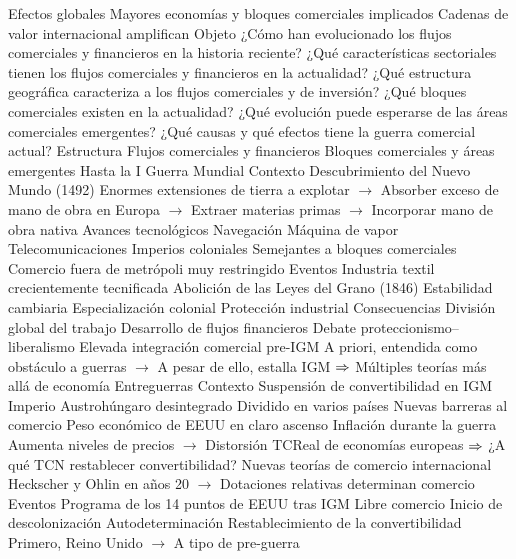 \documentclass{nuevotema}
\begin{document}
\begin{esquemal}
				\4 Efectos globales
				\4[] Mayores economías y bloques comerciales implicados
				\4[] Cadenas de valor internacional amplifican
		\2 Objeto
			\3 ¿Cómo han evolucionado los flujos comerciales y financieros en la historia reciente?
			\3 ¿Qué características sectoriales tienen los flujos comerciales y financieros en la actualidad?
			\3 ¿Qué estructura geográfica caracteriza a los flujos comerciales y de inversión?
			\3 ¿Qué bloques comerciales existen en la actualidad?
			\3 ¿Qué evolución puede esperarse de las áreas comerciales emergentes?
			\3 ¿Qué causas y qué efectos tiene la guerra comercial actual?
		\2 Estructura
			\3 Flujos comerciales y financieros
			\3 Bloques comerciales y áreas emergentes
	\1 
		\2 Hasta la I Guerra Mundial
			\3 Contexto
				\4 Descubrimiento del Nuevo Mundo (1492)
				\4[] Enormes extensiones de tierra a explotar
				\4[] $\to$ Absorber exceso de mano de obra en Europa
				\4[] $\to$ Extraer materias primas
				\4[] $\to$ Incorporar mano de obra nativa
				\4 Avances tecnológicos
				\4[] Navegación
				\4[] Máquina de vapor
				\4[] Telecomunicaciones
				\4 Imperios coloniales
				\4[] Semejantes a bloques comerciales
				\4[] Comercio fuera de metrópoli muy restringido
			\3 Eventos
				\4 Industria textil crecientemente tecnificada
				\4 Abolición de las Leyes del Grano (1846)
				\4 Estabilidad cambiaria
				\4 Especialización colonial
				\4 Protección industrial
			\3 Consecuencias
				\4 División global del trabajo
				\4 Desarrollo de flujos financieros
				\4 Debate proteccionismo--liberalismo
				\4 Elevada integración comercial pre-IGM
				\4[] A priori, entendida como obstáculo a guerras
				\4[] $\to$ A pesar de ello, estalla IGM
				\4[] $\Rightarrow$ Múltiples teorías más allá de economía
		\2 Entreguerras
			\3 Contexto
				\4 Suspensión de convertibilidad en IGM
				\4 Imperio Austrohúngaro desintegrado
				\4[] Dividido en varios países
				\4[] Nuevas barreras al comercio
				\4 Peso económico de EEUU en claro ascenso
				\4 Inflación durante la guerra
				\4[] Aumenta niveles de precios
				\4[] $\to$ Distorsión TCReal de economías europeas
				\4[] $\Rightarrow$ ¿A qué TCN restablecer convertibilidad?
				\4 Nuevas teorías de comercio internacional
				\4[] Heckscher y Ohlin en años 20
				\4[] $\to$ Dotaciones relativas determinan comercio
			\3 Eventos
				\4 Programa de los 14 puntos de EEUU tras IGM
				\4[] Libre comercio
				\4[] Inicio de descolonización
				\4[] Autodeterminación
				\4 Restablecimiento de la convertibilidad
				\4[] Primero, Reino Unido
				\4[] $\to$ A tipo de pre-guerra

\end{esquemal}
\end{document}
